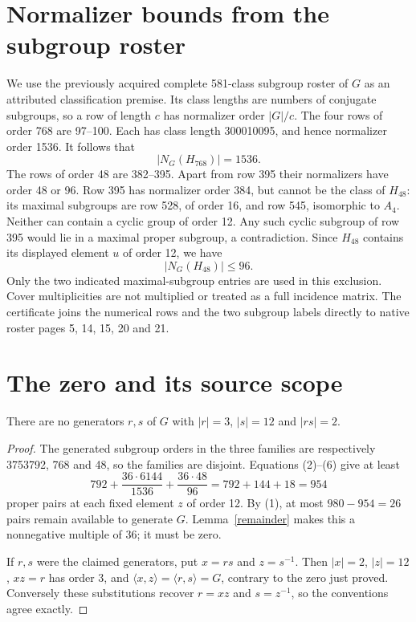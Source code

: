 \documentclass[11pt,a4paper]{article}
\begin{document}
\section{Normalizer bounds from the subgroup roster}
We use the previously acquired complete 581-class subgroup roster
of $G$ as an attributed classification premise. Its class lengths
are numbers of conjugate subgroups, so a row of length $c$ has
normalizer order $|G|/c$. The four rows of order 768 are 97--100.
Each has class length 300010095, and hence normalizer order 1536.
It follows that
\[
                         |N_G(H_{768})|=1536.            \tag{5}
\]
The rows of order 48 are 382--395. Apart from row 395 their
normalizers have order 48 or 96. Row 395 has normalizer order 384,
but cannot be the class of $H_{48}$: its maximal subgroups are
row 528, of order 16, and row 545, isomorphic to $A_4$.
Neither can contain a cyclic group of order 12. Any such cyclic
subgroup of row 395 would lie in a maximal proper subgroup, a
contradiction. Since $H_{48}$ contains its displayed element $u$
of order 12, we have
\[
                         |N_G(H_{48})|\leq96.            \tag{6}
\]
Only the two indicated maximal-subgroup entries are used in this
exclusion. Cover multiplicities are not multiplied or treated as a
full incidence matrix. The certificate joins the numerical rows and
the two subgroup labels directly to native roster pages 5, 14, 15,
20 and 21.

\section{The zero and its source scope}
\begin{theorem}
There are no generators $r,s$ of $G$ with $|r|=3$, $|s|=12$ and
$|rs|=2$.
\end{theorem}
\begin{proof}
The generated subgroup orders in the three families are respectively
3753792, 768 and 48, so the families are disjoint. Equations (2)--(6)
give at least
\[
  792+\frac{36\cdot6144}{1536}+\frac{36\cdot48}{96}
                       =792+144+18=954                 \tag{7}
\]
proper pairs at each fixed element $z$ of order 12. By (1), at most
$980-954=26$ pairs remain available to generate $G$. Lemma~\ref{remainder}
makes this a nonnegative multiple of 36; it must be zero.

If $r,s$ were the claimed generators, put $x=rs$ and $z=s^{-1}$.
Then $|x|=2$, $|z|=12$, $xz=r$ has order 3, and
$\langle x,z\rangle=\langle r,s\rangle=G$, contrary to the zero
just proved. Conversely these substitutions recover $r=xz$ and
$s=z^{-1}$, so the conventions agree exactly.
\end{proof}
\end{document}

